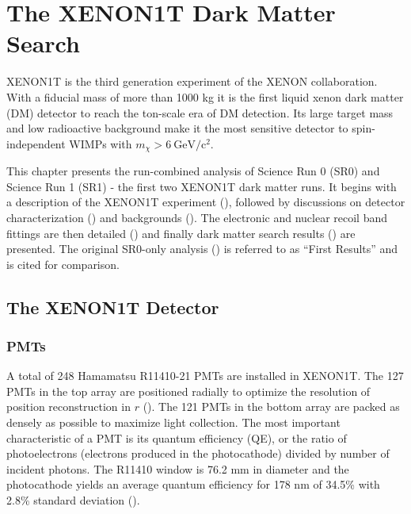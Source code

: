 

\pagestyle{cu}
\graphicspath{{./Chapter3/Figures/}}
\chapter[The XENON1T Dark Matter Search][The XENON1T Dark Matter Search]{The XENON1T Dark Matter Search}



XENON1T is the third generation experiment of the XENON collaboration.  With a fiducial mass of more than 1000 kg it is the first
liquid xenon dark matter (DM) detector to reach the ton-scale era of DM detection.  Its large target mass and low radioactive background
make it the most sensitive detector to spin-independent WIMPs with $m_{\chi} > 6\ \mathrm{GeV / c^2}$.

This chapter presents the run-combined analysis of Science Run 0 (SR0) and Science Run 1 (SR1) - the first two XENON1T dark matter
runs.  It begins with a description of the XENON1T experiment (), followed by discussions on detector
characterization () and backgrounds
().  The electronic and nuclear recoil band fittings are
then detailed () and finally dark matter search results () are
presented.  The original SR0-only analysis () is referred to as ``First Results'' and is cited for comparison.

\section{The XENON1T Detector}
\label{sec:xenon1t_detector}




\subsection{PMTs}
\label{subsec:xenon1t_pmts}
A total of 248 Hamamatsu R11410-21 PMTs are installed in XENON1T.  The 127 PMTs in the top array are positioned radially to
optimize the resolution of position reconstruction in $r$ ().  The 121 PMTs in the bottom
array
are packed as densely as possible to maximize light collection.  The most important characteristic of a PMT is its quantum efficiency
(QE), or the ratio of photoelectrons (electrons produced in the photocathode) divided by number of incident photons.  The R11410 window is
76.2 mm in diameter and the photocathode yields an average quantum efficiency for 178 nm of 34.5\% with 2.8\%
standard deviation ().

